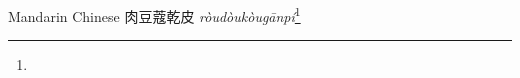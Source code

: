 \begin{etymology}\label{ety:roudoukoupi}
Mandarin Chinese {肉豆蔻乾皮} \textit{ròudòukòugānpí}\footnote{}
\end{etymology}